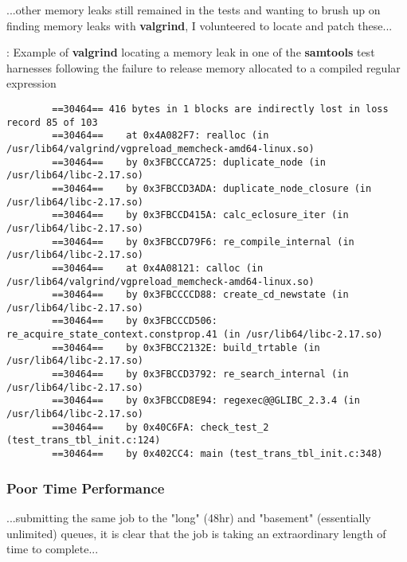 ...other memory leaks still remained in the tests and wanting to brush up on
finding memory leaks with \textbf{valgrind}, I volunteered to locate and patch
these...


\begin{listing}[H]
    \caption[valgrind-regex]{: Example of \textbf{valgrind} locating a memory
        leak in one of the \textbf{samtools} test harnesses following the failure
        to release memory allocated to a compiled regular expression}
    \label{list:valgrind-regex}
    \begin{verbatim}
        ==30464== 416 bytes in 1 blocks are indirectly lost in loss record 85 of 103
        ==30464==    at 0x4A082F7: realloc (in /usr/lib64/valgrind/vgpreload_memcheck-amd64-linux.so)
        ==30464==    by 0x3FBCCCA725: duplicate_node (in /usr/lib64/libc-2.17.so)
        ==30464==    by 0x3FBCCD3ADA: duplicate_node_closure (in /usr/lib64/libc-2.17.so)
        ==30464==    by 0x3FBCCD415A: calc_eclosure_iter (in /usr/lib64/libc-2.17.so)
        ==30464==    by 0x3FBCCD79F6: re_compile_internal (in /usr/lib64/libc-2.17.so)
        ==30464==    at 0x4A08121: calloc (in /usr/lib64/valgrind/vgpreload_memcheck-amd64-linux.so)
        ==30464==    by 0x3FBCCCCD88: create_cd_newstate (in /usr/lib64/libc-2.17.so)
        ==30464==    by 0x3FBCCCD506: re_acquire_state_context.constprop.41 (in /usr/lib64/libc-2.17.so)
        ==30464==    by 0x3FBCC2132E: build_trtable (in /usr/lib64/libc-2.17.so)
        ==30464==    by 0x3FBCCD3792: re_search_internal (in /usr/lib64/libc-2.17.so)
        ==30464==    by 0x3FBCCD8E94: regexec@@GLIBC_2.3.4 (in /usr/lib64/libc-2.17.so)
        ==30464==    by 0x40C6FA: check_test_2 (test_trans_tbl_init.c:124)
        ==30464==    by 0x402CC4: main (test_trans_tbl_init.c:348)
    \end{verbatim}
\end{listing}

\subsubsection{Poor Time Performance}
...submitting the same job to the "long" (48hr) and "basement" (essentially
unlimited) queues, it is clear that the job is taking an extraordinary length of
time to complete...

